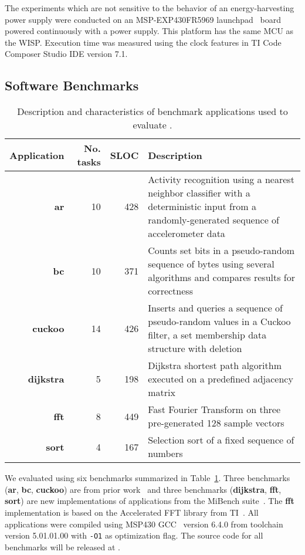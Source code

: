 The experiments which are not sensitive to the behavior of an
energy-harvesting power supply were conducted on an MSP-EXP430FR5969
launchpad~\cite{MSP-EXP430FR5969_launchpad} board powered continuously with a
power supply.
%
This platform has the same MCU as the WISP.
%
Execution time was measured using the clock features in TI Code
Composer Studio IDE version 7.1.
%

\subsection{Software Benchmarks}
\label{sec:software_benchmarks}

\begin{table}
	\centering
	\footnotesize
	\begin{tabular}{| r|r|r | p{} |}
		\hline
		Application & No. tasks & SLOC & Description \\
		\hline\hline
        \textbf{ar} &10 &428 & Activity recognition using a nearest neighbor
classifier with a deterministic input from a randomly-generated sequence of
accelerometer data\\
		\hline
        \textbf{bc} &10 &371 & Counts set bits in a pseudo-random sequence of bytes
using several algorithms and compares results for correctness\\
		\hline
        \textbf{cuckoo} &14 &426 & Inserts and queries a sequence of pseudo-random
values in a Cuckoo filter, a set membership data structure with deletion\\
		\hline
        \textbf{dijkstra} &5 &198 & Dijkstra shortest path algorithm executed on a
predefined adjacency matrix\\
		\hline
        \textbf{fft} &8 &449 & Fast Fourier Transform on three pre-generated 128
sample vectors\\
		\hline
		\textbf{sort} &4 &167 & Selection sort of a fixed sequence of numbers\\
		\hline
	\end{tabular}
\caption{Description and characteristics of benchmark applications used to
evaluate \sys.}
\label{table:benchmark_table}
\end{table}

We evaluated \sys using six benchmarks summarized in
Table~\ref{table:benchmark_table}. %
Three benchmarks (\textbf{ar}, \textbf{bc}, \textbf{cuckoo}) are from prior
work~\cite{chain,alpaca} and three benchmarks (\textbf{dijkstra},
\textbf{fft}, \textbf{sort}) are new implementations of applications
from the MiBench suite~\cite{mibench,hicks_mibench2_2016}. The
\textbf{fft} implementation is based on the Accelerated FFT library from
TI~\cite{ti_dsp}. All applications were compiled using MSP430 GCC~\cite{ti-gcc} version 6.4.0
from toolchain version 5.01.01.00 with \texttt{-O1} as optimization flag.
%
The source code for all benchmarks will be released at \cite{coala_website}.


